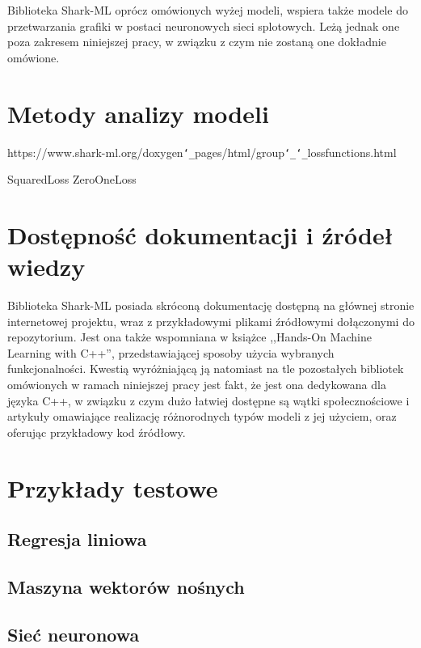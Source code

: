 Biblioteka Shark-ML oprócz omówionych wyżej modeli, wspiera także modele do przetwarzania grafiki w postaci neuronowych sieci splotowych. Leżą jednak one poza zakresem niniejszej pracy, w związku z czym nie zostaną one dokładnie omówione.

\section{Metody analizy modeli}

https://www.shark-ml.org/doxygen\texttt{\char`_}pages/html/group\texttt{\char`_}\texttt{\char`_}lossfunctions.html

SquaredLoss
ZeroOneLoss

\section{Dostępność dokumentacji i źródeł wiedzy}

Biblioteka Shark-ML posiada skróconą dokumentację dostępną na głównej stronie internetowej projektu, wraz z przykładowymi plikami źródłowymi dołączonymi do repozytorium. Jest ona także wspomniana w książce ,,Hands-On Machine Learning with C++'', przedstawiającej sposoby użycia wybranych funkcjonalności. Kwestią wyróżniającą ją natomiast na tle pozostałych bibliotek omówionych w ramach niniejszej pracy jest fakt, że jest ona dedykowana dla języka C++, w związku z czym dużo łatwiej dostępne są wątki społecznościowe i artykuły omawiające realizację różnorodnych typów modeli z jej użyciem, oraz oferując przykładowy kod źródłowy.

\section{Przykłady testowe}
\subsection{Regresja liniowa}
\subsection{Maszyna wektorów nośnych}
\subsection{Sieć neuronowa}